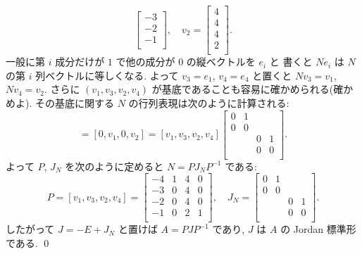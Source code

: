 \documentclass[12pt,twoside]{jarticle}
\begin{document}
\begin{example}
\begin{equation*}
\begin{bmatrix}
      -3 \\
      -2 \\
      -1 \\
    \end{bmatrix}, 
    \quad
    v_2 =
    \begin{bmatrix}
      4 \\
      4 \\
      4 \\
      2 \\
    \end{bmatrix}.
  \end{equation*}
  一般に第 $i$ 成分だけが $1$ で他の成分が $0$ の縦ベクトルを $e_i$ と
  書くと $Ne_i$ は $N$ の第 $i$ 列ベクトルに等しくなる.
  よって $v_3=e_1$, $v_4=e_4$ と置くと $Nv_3=v_1$, $Nv_4=v_2$.
  さらに $(v_1,v_3,v_2,v_4)$ が基底であることも容易に確かめられる(確かめよ).
  その基底に関する $N$ の行列表現は次のように計算される:
  \begin{equation*}
    [Nv_1,Nv_3,Nv_2,Nv_4]
    = [0,v_1,0,v_2] 
    = [v_1,v_3,v_2,v_4]
    \begin{bmatrix}
      0 & 1 &   &   \\
      0 & 0 &   &   \\
        &   & 0 & 1 \\
        &   & 0 & 0 \\
    \end{bmatrix}.
  \end{equation*}
  よって $P$, $J_N$ を次のように定めると $N=PJ_NP^{-1}$ である:
  \begin{equation*}
    P = [v_1,v_3,v_2,v_4] =
    \begin{bmatrix}
      -4 & 1 & 4 & 0 \\
      -3 & 0 & 4 & 0 \\
      -2 & 0 & 4 & 0 \\
      -1 & 0 & 2 & 1 \\
    \end{bmatrix},
    \quad
    J_N =
    \begin{bmatrix}
      0 & 1 &   &   \\
      0 & 0 &   &   \\
        &   & 0 & 1 \\
        &   & 0 & 0 \\
    \end{bmatrix}.
  \end{equation*}
  したがって $J=-E+J_N$ と置けば $A=PJP^{-1}$ であり, 
  $J$ は $A$ の Jordan 標準形である.
  \qed
\end{example}
\end{document}
